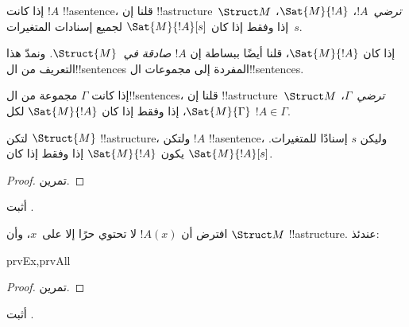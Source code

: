 \documentclass[../../../include/open-logic-section]{subfiles}
\begin{document}
\begin{defn}
إذا كانت $!A$ !!a{sentence}، قلنا إن !!a{structure}~$\Struct M$
\emph{ترضي}~$!A$، $\Sat{M}{!A}$، إذا وفقط إذا كان
$\Sat{M}{!A}[s]$ لجميع إسنادات المتغيرات~$s$.
\end{defn}

إذا كان $\Sat{M}{!A}$، قلنا أيضًا ببساطة إن
\emph{$!A$ صادقة في~$\Struct{M}$.} ونمدّ هذا التعريف
من ال!!{sentence}s المفردة إلى مجموعات ال!!{sentence}s.

\begin{defn}
إذا كانت $\Gamma$ مجموعة من ال!!{sentence}s، قلنا إن
!!a{structure}~$\Struct M$ \emph{ترضي}~$\Gamma$،
$\Sat{M}{\Gamma}$، إذا وفقط إذا كان $\Sat{M}{!A}$ لكل
$!A \in \Gamma$.
\end{defn}

\begin{prop}
  لتكن $\Struct{M}$ !!a{structure}، ولتكن $!A$ !!a{sentence}، وليكن
  $s$ إسنادًا للمتغيرات. يكون $\Sat{M}{!A}$ إذا وفقط إذا كان
  $\Sat{M}{!A}[s]$.
\end{prop}

\begin{proof}
تمرين.
\end{proof}

\begin{prob}
أثبت .
\end{prob}

\begin{prop}
  افترض أن $!A(x)$ لا تحتوي حرًا إلا على~$x$، وأن $\Struct M$
  !!a{structure}. عندئذ:
  \begin{tagenumerate}{prvEx,prvAll}
\end{tagenumerate}
\end{prop}

\begin{proof}
تمرين.
\end{proof}

\begin{prob}
أثبت .
\end{prob}
\end{document}
